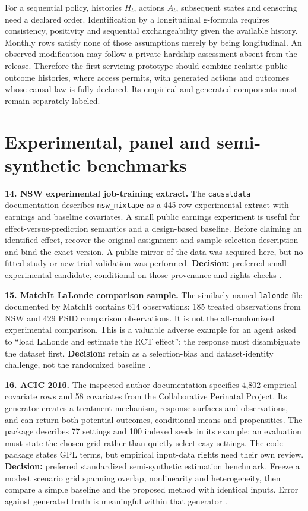 For a sequential policy, histories \(H_t\), actions \(A_t\), subsequent
states and censoring need a declared order. Identification by a
longitudinal g-formula requires consistency, positivity and sequential
exchangeability given the available history. Monthly rows satisfy none
of those assumptions merely by being longitudinal. An observed
modification may follow a private hardship assessment absent from the
release. Therefore the first servicing prototype should combine
realistic public outcome histories, where access permits, with generated
actions and outcomes whose causal law is fully declared. Its empirical
and generated components must remain separately labeled.

\hypertarget{experimental-panel-and-semi-synthetic-benchmarks}{%
\section{Experimental, panel and semi-synthetic
benchmarks}\label{experimental-panel-and-semi-synthetic-benchmarks}}

\textbf{14. NSW experimental job-training extract.} The
\texttt{causaldata} documentation describes \texttt{nsw\_mixtape} as a
445-row experimental extract with earnings and baseline covariates. A
small public earnings experiment is useful for effect-versus-prediction
semantics and a design-based baseline. Before claiming an identified
effect, recover the original assignment and sample-selection description
and bind the exact version. A public mirror of the data was acquired
here, but no fitted study or new trial validation was performed.
\textbf{Decision:} preferred small experimental candidate, conditional
on those provenance and rights checks \citep{pd15_nsw_docs}.

\textbf{15. MatchIt LaLonde comparison sample.} The similarly named
\texttt{lalonde} file documented by MatchIt contains 614 observations:
185 treated observations from NSW and 429 PSID comparison observations.
It is not the all-randomized experimental comparison. This is a valuable
adverse example for an agent asked to ``load LaLonde and estimate the
RCT effect'': the response must disambiguate the dataset first.
\textbf{Decision:} retain as a selection-bias and dataset-identity
challenge, not the randomized baseline \citep{pd15_lalonde_pinned}.

\textbf{16. ACIC 2016.} The inspected author documentation specifies
4,802 empirical covariate rows and 58 covariates from the Collaborative
Perinatal Project. Its generator creates a treatment mechanism, response
surfaces and observations, and can return both potential outcomes,
conditional means and propensities. The package describes 77 settings
and 100 indexed seeds in its example; an evaluation must state the
chosen grid rather than quietly select easy settings. The code package
states GPL terms, but empirical input-data rights need their own review.
\textbf{Decision:} preferred standardized semi-synthetic estimation
benchmark. Freeze a modest scenario grid spanning overlap, nonlinearity
and heterogeneity, then compare a simple baseline and the proposed
method with identical inputs. Error against generated truth is
meaningful within that generator \citep{pd15_acic_pinned}.

